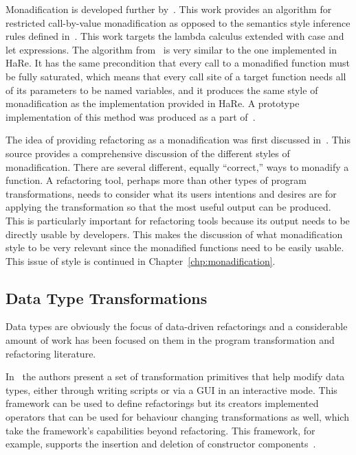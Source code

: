 Monadification is developed further by~\citep{monadification}. This work provides an algorithm for restricted call-by-value monadification as opposed to the semantics style inference rules defined in~\citep{lammelReuse}. This work targets the lambda calculus extended with case and let expressions. The algorithm from~\citep{monadification} is very similar to the one implemented in HaRe. It has the same precondition that every call to a monadified function must be fully saturated, which means that every call site of a target function needs all of its parameters to be named variables, and it produces the same style of monadification as the implementation provided in HaRe. A prototype implementation of this method was produced as a part of~\citep{monadification}.

The idea of providing refactoring as a monadification was first discussed in~\cite{monadSurvey}. This source provides a comprehensive discussion of the different styles of monadification. There are several different, equally ``correct,'' ways to monadify a function. A refactoring tool, perhaps more than other types of program transformations, needs to consider what its users intentions and desires are for applying the transformation so that the most useful output can be produced. This is particularly important for refactoring tools because its output needs to be directly usable by developers. This makes the discussion of what monadification style to be very relevant since the monadified functions need to be easily usable. This issue of style is continued in Chapter~\ref{chp:monadification}. 

\subsection{Data Type Transformations}\label{dtt}

Data types are obviously the focus of data-driven refactorings and a considerable amount of work has been focused on them in the program transformation and refactoring literature. 

In~\cite{dataTypeFramework} the authors present a set of transformation primitives that help modify data types, either through writing scripts or via a GUI in an interactive mode. This framework can be used to define refactorings but its creators implemented operators that can be used for behaviour changing transformations as well, which take the framework's capabilities beyond refactoring. This framework, for example, supports the insertion and deletion of constructor components~\citep{dataTypeFramework}. 

